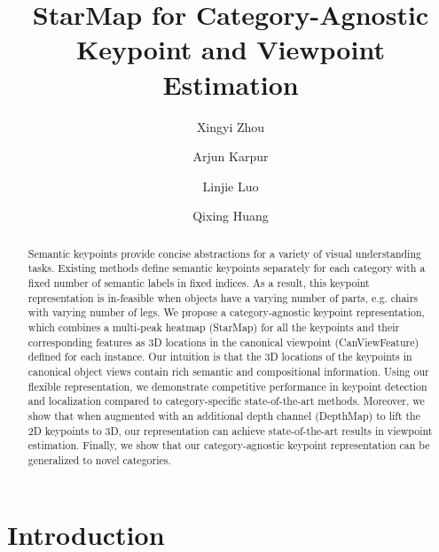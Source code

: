 \documentclass[runningheads]{llncs}
\begin{document}
\newcommand\hide[1]{}
\let\bs=\mathbf

\pagestyle{headings}
\mainmatter

\title{StarMap for Category-Agnostic Keypoint and Viewpoint Estimation} 



\author{Xingyi Zhou \and Arjun Karpur
\and Linjie Luo \and Qixing Huang}





\maketitle

\begin{abstract}
Semantic keypoints provide concise abstractions for a variety of visual understanding tasks. Existing methods define semantic keypoints separately for each category with a fixed number of semantic labels in fixed indices. 
As a result, this keypoint representation is in-feasible when objects have a varying number of parts, 
e.g. chairs with varying number of legs. 
We propose a category-agnostic keypoint representation, which combines a multi-peak heatmap (StarMap) for all the keypoints and their corresponding features as 3D locations in the canonical viewpoint (CanViewFeature) defined for each instance.
Our intuition is that the 3D locations of the keypoints in canonical object views contain rich semantic and compositional information.
Using our flexible representation, we demonstrate competitive performance in keypoint detection and localization compared to category-specific state-of-the-art methods.
Moreover, we show that when augmented with an additional depth channel (DepthMap) to lift the 2D keypoints to 3D,
our representation can achieve state-of-the-art results in viewpoint estimation. 
Finally, we show that our category-agnostic keypoint representation can be generalized to novel categories. 

\end{abstract}

\section{Introduction}
\end{document}
